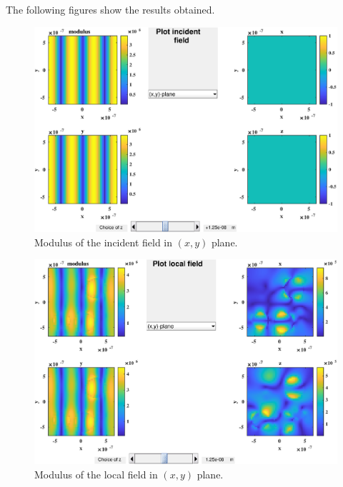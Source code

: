 The following figures show the results obtained.
\begin{figure}[H]
\begin{center}
  \includegraphics*[width=15.0cm,draft=false]{test2incident.eps}
\end{center}
\caption{Modulus of the incident field in $(x,y)$ plane.}
\end{figure}
\begin{figure}[H]
\begin{center}
  \includegraphics*[width=15.0cm,draft=false]{test2local.eps}
\end{center}
\caption{Modulus of the local field in $(x,y)$ plane.}
\end{figure}
